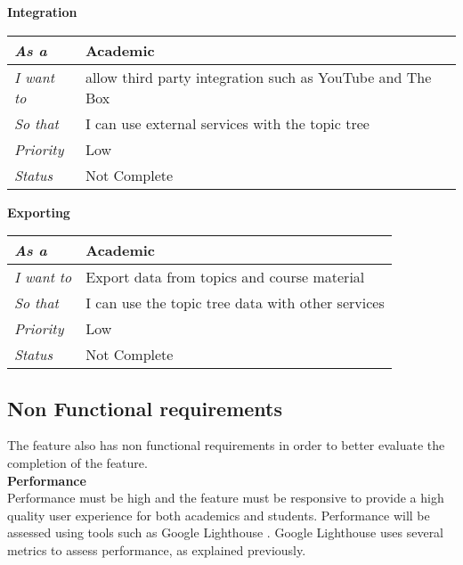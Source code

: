 \textbf{Integration}

\begin{table}[hp]
\begin{tabular}{|l|l|}
\hline
\textit{As a}      & Academic                                                  \\ \hline
\textit{I want to} & allow third party integration such as YouTube and The Box \\ \hline
\textit{So that}   & I can use external services with the topic tree           \\ \hline
\textit{Priority}  & {\color[HTML]{3531FF} Low}                                \\ \hline
\textit{Status}    & Not Complete                                              \\ \hline
\end{tabular}
\end{table}

\textbf{Exporting}

\begin{table}[hp]
\begin{tabular}{|l|l|}
\hline
\textit{As a}      & Academic                                          \\ \hline
\textit{I want to} & Export data from topics and course material       \\ \hline
\textit{So that}   & I can use the topic tree data with other services \\ \hline
\textit{Priority}  & {\color[HTML]{3531FF} Low}                        \\ \hline
\textit{Status}    & Not Complete                                      \\ \hline
\end{tabular}
\end{table}

\subsection{Non Functional requirements}
The feature also has non functional requirements in order to better evaluate the completion of the feature. \\

\textbf{Performance} \\
Performance must be high and the feature must be responsive to provide a high quality user experience for both academics and students. Performance will be assessed using tools such as Google Lighthouse \cite{googleLighthouse}. Google Lighthouse uses several metrics to assess performance, as explained previously. \\

